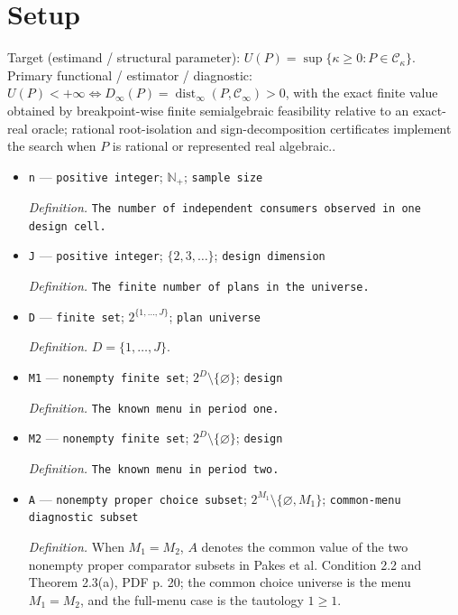 \documentclass{article}
\begin{document}
\section{Setup}

Target (estimand / structural parameter): \(U(P)=\sup\{\kappa\ge0:P\in\mathcal C_\kappa\}\).
Primary functional / estimator / diagnostic: \(U(P)<+\infty\iff D_\infty(P)=\operatorname{dist}_\infty(P,\mathcal C_\infty)>0\), with the exact finite value obtained by breakpoint-wise finite semialgebraic feasibility relative to an exact-real oracle; rational root-isolation and sign-decomposition certificates implement the search when \(P\) is rational or represented real algebraic..
\begin{itemize}
  \item \texttt{n} --- \texttt{positive integer}; \(\mathbb N_{+}\); \texttt{sample size}
  \par\smallskip\noindent\emph{Definition.} \texttt{The number of independent consumers observed in one design cell.}
  \item \texttt{J} --- \texttt{positive integer}; \(\{2,3,\ldots\}\); \texttt{design dimension}
  \par\smallskip\noindent\emph{Definition.} \texttt{The finite number of plans in the universe.}
  \item \texttt{D} --- \texttt{finite set}; \(2^{\{1,\ldots,J\}}\); \texttt{plan universe}
  \par\smallskip\noindent\emph{Definition.} \(D=\{1,\ldots,J\}\).
  \item \texttt{M1} --- \texttt{nonempty finite set}; \(2^D\setminus\{\varnothing\}\); \texttt{design}
  \par\smallskip\noindent\emph{Definition.} \texttt{The known menu in period one.}
  \item \texttt{M2} --- \texttt{nonempty finite set}; \(2^D\setminus\{\varnothing\}\); \texttt{design}
  \par\smallskip\noindent\emph{Definition.} \texttt{The known menu in period two.}
  \item \texttt{A} --- \texttt{nonempty proper choice subset}; \(2^{M_1}\setminus\{\varnothing,M_1\}\); \texttt{common-\allowbreak{}menu diagnostic subset}
  \par\smallskip\noindent\emph{Definition.} When \(M_1=M_2\), \(A\) denotes the common value of the two nonempty proper comparator subsets in Pakes et al. Condition 2.2 and Theorem 2.3(a), PDF p. 20; the common choice universe is the menu \(M_1=M_2\), and the full-menu case is the tautology \(1\ge1\).

\end{itemize}
\end{document}

